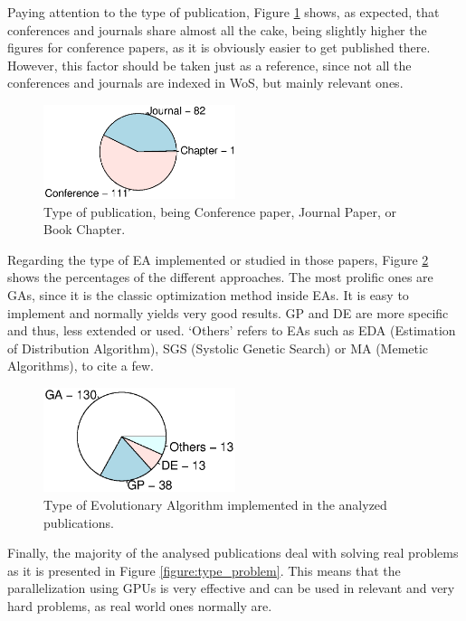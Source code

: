 \documentclass{article}
\begin{document}
Paying attention to the type of publication, Figure \ref{figure:type_publication} shows, as expected, that conferences and journals share almost all the cake, being slightly higher the figures for conference papers, as it is obviously easier to get published there. However, this factor should be taken just as a reference, since not all the conferences and journals are indexed in WoS, but mainly relevant ones.

\begin{figure}[!ht]
\centering
\includegraphics[clip,trim=16 64 16 64,width=0.5\textwidth]{papertype.eps}
\caption{Type of publication, being Conference paper, Journal Paper, or Book Chapter.}
\label{figure:type_publication}
\end{figure}

Regarding the type of EA implemented or studied in those papers, Figure \ref{figure:type_algorithm} shows the percentages of the different approaches. The most prolific ones are GAs, since it is the classic optimization method inside EAs. It is easy to implement and normally yields very good results.  GP and DE are more specific and thus, less extended or used. `Others' refers to EAs such as EDA (Estimation of Distribution Algorithm), SGS (Systolic Genetic Search) or MA (Memetic Algorithms), to cite a few.

\begin{figure}[!ht]
\centering
\includegraphics[clip,trim=16 64 16 64,width=0.5\textwidth]{algorithmtype.eps}
\caption{Type of Evolutionary Algorithm implemented in the analyzed publications.}
\label{figure:type_algorithm}
\end{figure}

Finally, the majority of the analysed publications deal with solving real problems as it is presented in Figure \ref{figure:type_problem}. This means that the parallelization using GPUs is very effective and can be used in relevant and very hard problems, as real world ones normally are.
\end{document}
